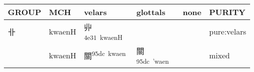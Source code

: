 \documentclass[14pt,a4paper]{scrartcl}
\begin{document}
\begin{longtable}[c]{@{}llllll@{}}
\toprule
\begin{minipage}[b]{0.14\columnwidth}\raggedright\strut
GROUP
\strut\end{minipage} &
\begin{minipage}[b]{0.14\columnwidth}\raggedright\strut
MCH
\strut\end{minipage} &
\begin{minipage}[b]{0.14\columnwidth}\raggedright\strut
velars
\strut\end{minipage} &
\begin{minipage}[b]{0.14\columnwidth}\raggedright\strut
glottals
\strut\end{minipage} &
\begin{minipage}[b]{0.14\columnwidth}\raggedright\strut
none
\strut\end{minipage} &
\begin{minipage}[b]{0.14\columnwidth}\raggedright\strut
PURITY
\strut\end{minipage}\tabularnewline
\midrule
\endhead
\begin{minipage}[t]{0.14\columnwidth}\raggedright\strut
卝
\strut\end{minipage} &
\begin{minipage}[t]{0.14\columnwidth}\raggedright\strut
kwaenH
\strut\end{minipage} &
\begin{minipage}[t]{0.14\columnwidth}\raggedright\strut
丱\textsuperscript{4e31~kwaenH}
\strut\end{minipage} &
\begin{minipage}[t]{0.14\columnwidth}\raggedright\strut
\strut\end{minipage} &
\begin{minipage}[t]{0.14\columnwidth}\raggedright\strut
\strut\end{minipage} &
\begin{minipage}[t]{0.14\columnwidth}\raggedright\strut
pure:velars
\strut\end{minipage}\tabularnewline
\begin{minipage}[t]{0.14\columnwidth}\raggedright\strut
𢇇
\strut\end{minipage} &
\begin{minipage}[t]{0.14\columnwidth}\raggedright\strut
kwaenH
\strut\end{minipage} &
\begin{minipage}[t]{0.14\columnwidth}\raggedright\strut
關\textsuperscript{95dc~kwaen}
\strut\end{minipage} &
\begin{minipage}[t]{0.14\columnwidth}\raggedright\strut
關\textsuperscript{95dc~'waen}
\strut\end{minipage} &
\begin{minipage}[t]{0.14\columnwidth}\raggedright\strut
\strut\end{minipage} &
\begin{minipage}[t]{0.14\columnwidth}\raggedright\strut
mixed
\strut\end{minipage}\tabularnewline
\bottomrule
\end{longtable}
\end{document}
